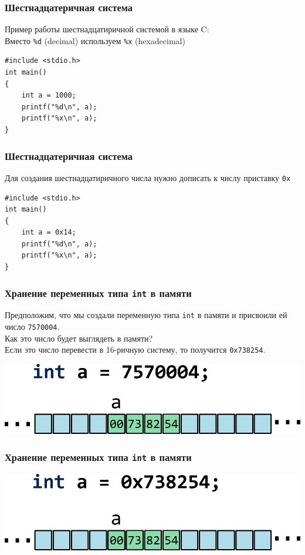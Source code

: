 \documentclass[12pt,pdf,hyperref={unicode}]{beamer}
\begin{document}
\begin{frame}[fragile]
\frametitle{Шестнадцатеричная система} 
Пример работы шестнадцатиричной системой в языке C:\\
Вместо \texttt{\%d} (decimal) используем \texttt{\%x} (hexadecimal)
\begin{lstlisting}
#include <stdio.h>
int main()
{
	int a = 1000;
	printf("%d\n", a);
	printf("%x\n", a);
}
\end{lstlisting}
\end{frame}

\begin{frame}[fragile]
\frametitle{Шестнадцатеричная система} 
Для создания шестнадцатиричного числа нужно дописать 
к числу приставку \texttt{0x}
\begin{lstlisting}
#include <stdio.h>
int main()
{
	int a = 0x14;
	printf("%d\n", a);
	printf("%x\n", a);
}
\end{lstlisting}
\end{frame}

\begin{frame}[fragile]
\frametitle{Хранение переменных типа \texttt{int} в памяти}
Предположим, что мы создали переменную типа \texttt{int} в памяти и присвоили ей число \texttt{7570004}.\\
Как это число будет выглядеть в памяти?\\
Если это число перевести в 16-ричную систему, то получится \texttt{0x738254}.
\begin{center}
\includegraphics[width=0.95\linewidth]{../images/memory/memory_0_int_dec.png}
\end{center}
\end{frame}

\begin{frame}[fragile]
\frametitle{Хранение переменных типа \texttt{int} в памяти} 
\begin{center}
\includegraphics[width=0.95\linewidth]{../images/memory/memory_0_int_hex.png}
\end{center}
\end{frame}
\end{document}
